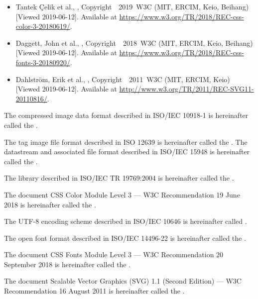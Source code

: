 \begin{itemize}
\item Tantek \c{C}elik et al., , 
Copyright~\textcopyright~2019~W3C\textsuperscript{\textregistered} (MIT, ERCIM, 
Keio, Beihang) [Viewed 2019-06-12]. Available at \url{https://www.w3.org/TR/2018/REC-css-color-3-20180619/}.
\item Daggett, John et al., , Copyright~\textcopyright~2018~W3C\textsuperscript{\textregistered} (MIT, ERCIM, 
Keio, Beihang) [Viewed 2019-06-12]. Available at \url{https://www.w3.org/TR/2018/REC-css-fonts-3-20180920/}.
\item Dahlstr\"{o}m, Erik et al., , Copyright~\textcopyright~2011~W3C\textsuperscript{\textregistered} (MIT, ERCIM, Keio) [Viewed 2019-06-12]. Available at \url{http://www.w3.org/TR/2011/REC-SVG11-20110816/}.
\end{itemize}

\pnum
The compressed image data format described in ISO/IEC 10918-1 is hereinafter called the .

\pnum
The tag image file format described in ISO 12639 is hereinafter called the .
\pnum
The datastream and associated file format described in ISO/IEC 15948 is hereinafter called the .

\pnum
The library described in ISO/IEC TR 19769:2004 is hereinafter called the
.

\pnum
The document CSS Color Module Level 3 --- W3C Recommendation 19 June 2018 is 
hereinafter called the .

\pnum
The UTF-8 encoding scheme described in ISO/IEC 10646 is hereinafter called .

\pnum
The open font format described in ISO/IEC 14496-22 is hereinafter called the .

\pnum
The document CSS Fonts Module Level 3 --- W3C Recommendation 20 September 2018 is hereinafter called the .

\pnum
The document Scalable Vector Graphics (SVG) 1.1 (Second Edition) --- W3C Recommendation 16 August 2011 is hereinafter called the .
